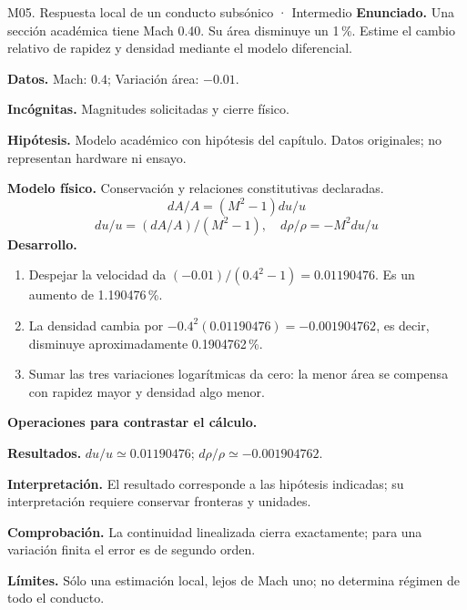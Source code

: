 \begin{studiumworked}{M05. Respuesta local de un conducto subsónico · Intermedio}
\textbf{Enunciado.} Una sección académica tiene Mach 0.40. Su área disminuye un 1\,\%. Estime el cambio relativo de rapidez y densidad mediante el modelo diferencial.

\textbf{Datos.} Mach: $0.4$; Variación área: $-0.01$.

\textbf{Incógnitas.} Magnitudes solicitadas y cierre físico.

\textbf{Hipótesis.} Modelo académico con hipótesis del capítulo. Datos originales; no representan hardware ni ensayo.

\textbf{Modelo físico.} Conservación y relaciones constitutivas declaradas.
\[dA/A=(M^2-1)du/u\]
\[du/u=(dA/A)/(M^2-1),\quad d\rho/\rho=-M^2du/u\]
\textbf{Desarrollo.}
\begin{enumerate}
\item Despejar la velocidad da $(-0.01)/(0.4^2-1)=0.01190476$. Es un aumento de 1.190476\,\%.
\item La densidad cambia por $-0.4^2(0.01190476)=-0.001904762$, es decir, disminuye aproximadamente 0.1904762\,\%.
\item Sumar las tres variaciones logarítmicas da cero: la menor área se compensa con rapidez mayor y densidad algo menor.
\end{enumerate}
\textbf{Operaciones para contrastar el cálculo.}

\textbf{Resultados.} $du/u\simeq0.01190476$; $d\rho/\rho\simeq-0.001904762$.

\textbf{Interpretación.} El resultado corresponde a las hipótesis indicadas; su interpretación requiere conservar fronteras y unidades.

\textbf{Comprobación.} La continuidad linealizada cierra exactamente; para una variación finita el error es de segundo orden.

\textbf{Límites.} Sólo una estimación local, lejos de Mach uno; no determina régimen de todo el conducto.
\end{studiumworked}
